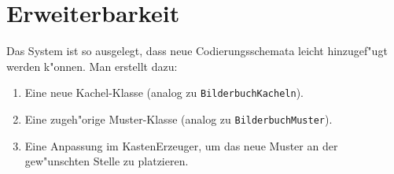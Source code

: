 \documentclass[a4paper,12pt]{article}
\begin{document}
\section{Erweiterbarkeit}
Das System ist so ausgelegt, dass neue Codierungsschemata leicht hinzugef"ugt werden k"onnen. Man erstellt dazu:
\begin{enumerate}
    \item Eine neue Kachel-Klasse (analog zu \texttt{BilderbuchKacheln}).
    \item Eine zugeh"orige Muster-Klasse (analog zu \texttt{BilderbuchMuster}).
    \item Eine Anpassung im KastenErzeuger, um das neue Muster an der gew"unschten Stelle zu platzieren.
\end{enumerate}
\end{document}
